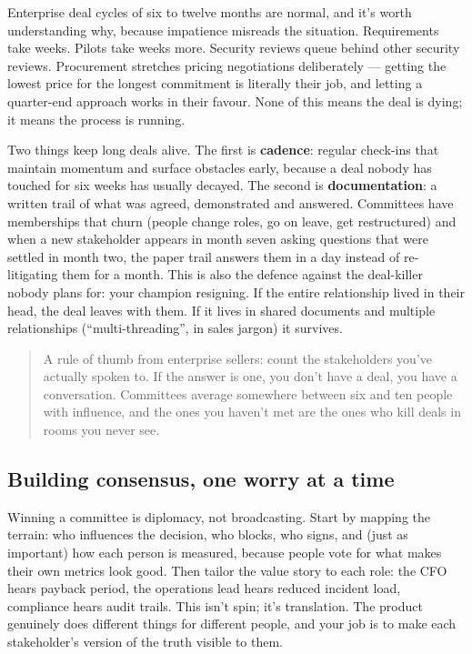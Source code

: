 Enterprise deal cycles of six to twelve months are normal, and it's worth understanding why, because impatience misreads the situation. Requirements take weeks. Pilots take weeks more. Security reviews queue behind other security reviews. Procurement stretches pricing negotiations deliberately — getting the lowest price for the longest commitment is literally their job, and letting a quarter-end approach works in their favour. None of this means the deal is dying; it means the process is running.


Two things keep long deals alive. The first is \textbf{cadence}: regular check-ins that maintain momentum and surface obstacles early, because a deal nobody has touched for six weeks has usually decayed. The second is \textbf{documentation}: a written trail of what was agreed, demonstrated and answered. Committees have memberships that churn (people change roles, go on leave, get restructured) and when a new stakeholder appears in month seven asking questions that were settled in month two, the paper trail answers them in a day instead of re-litigating them for a month. This is also the defence against the deal-killer nobody plans for: your champion resigning. If the entire relationship lived in their head, the deal leaves with them. If it lives in shared documents and multiple relationships (``multi-threading'', in sales jargon) it survives.



\begin{quote}\small
A rule of thumb from enterprise sellers: count the stakeholders you've actually spoken to. If the answer is one, you don't have a deal, you have a conversation. Committees average somewhere between six and ten people with influence, and the ones you haven't met are the ones who kill deals in rooms you never see.
\end{quote}



\subsection{Building consensus, one worry at a time}


Winning a committee is diplomacy, not broadcasting. Start by mapping the terrain: who influences the decision, who blocks, who signs, and (just as important) how each person is measured, because people vote for what makes their own metrics look good. Then tailor the value story to each role: the CFO hears payback period, the operations lead hears reduced incident load, compliance hears audit trails. This isn't spin; it's translation. The product genuinely does different things for different people, and your job is to make each stakeholder's version of the truth visible to them.


